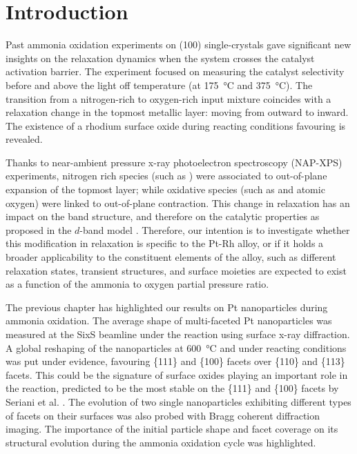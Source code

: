 \section{Introduction}

Past ammonia oxidation experiments on  (100) \parencite{Resta2020a} single-crystals gave significant new insights on the relaxation dynamics when the system crosses the catalyst activation barrier.
The experiment focused on measuring the catalyst selectivity before and above the light off temperature (at \qty{175}{\degreeCelsius} and \qty{375}{\degreeCelsius}).
The transition from a nitrogen-rich to oxygen-rich input mixture coincides with a relaxation change in the topmost metallic layer: moving from outward to inward.
The existence of a rhodium surface oxide during reacting conditions favouring  is revealed.

Thanks to near-ambient pressure x-ray photoelectron spectroscopy (NAP-XPS) experiments, nitrogen rich species (such as ) were associated to out-of-plane expansion of the topmost layer; while oxidative species (such as  and atomic oxygen) were linked to out-of-plane contraction.
This change in relaxation has an impact on the band structure, and therefore on the catalytic properties as proposed in the $d$-band model \parencite{Mavrikakis1998}.
Therefore, our intention is to investigate whether this modification in relaxation is specific to the Pt-Rh alloy, or if it holds a broader applicability to the constituent elements of the alloy, such as different relaxation states, transient structures, and surface moieties are expected to exist as a function of the ammonia to oxygen partial pressure ratio.

The previous chapter has highlighted our results on Pt nanoparticles during ammonia oxidation.
The average shape of multi-faceted Pt nanoparticles was measured at the SixS beamline under the reaction using surface x-ray diffraction.
A global reshaping of the nanoparticles at \qty{600}{\degreeCelsius} and under reacting conditions was put under evidence, favouring \{111\} and \{100\} facets over \{110\} and \{113\} facets.
This could be the signature of surface oxides playing an important role in the reaction, predicted to be the most stable on the \{111\} and \{100\} facets by Seriani et al. \parencite*{Seriani2008}.
The evolution of two single nanoparticles exhibiting different types of facets on their surfaces was also probed with Bragg coherent diffraction imaging.
The importance of the initial particle shape and facet coverage on its structural evolution during the ammonia oxidation cycle was highlighted.

